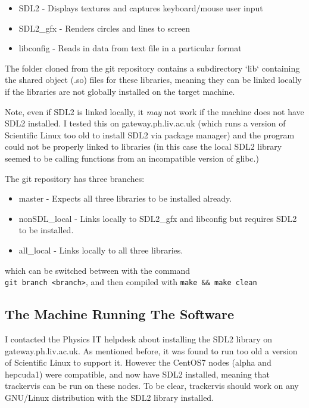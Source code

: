 \documentclass[12pt]{article}
\begin{document}
\begin{itemize}
	\item{SDL2 \quad - \quad Displays textures and captures keyboard/mouse user input}
	\item{SDL2\_gfx \quad - \quad Renders circles and lines to screen}
	\item{libconfig \quad - \quad Reads in data from text file in a particular format}
\end{itemize}

The folder cloned from the git repository contains a subdirectory `lib` containing the shared object (.so) files for these libraries, meaning they can be linked locally if the libraries are not globally installed on the target machine.\newline

Note, even if SDL2 is linked locally, it \emph{may} not work if the machine does not have SDL2 installed. I tested this on gateway.ph.liv.ac.uk (which runs a version of Scientific Linux too old to install SDL2 via package manager) and the program could not be properly linked to libraries (in this case the local SDL2 library seemed to be calling functions from an incompatible version of glibc.)\newline

The git repository has three branches:

\begin{itemize}
	\item{master \quad - \quad Expects all three libraries to be installed already.}
	\item{nonSDL\_local \quad - \quad Links locally to SDL2\_gfx and libconfig but requires SDL2 to be installed.}
	\item{all\_local \quad - \quad Links locally to all three libraries.}
\end{itemize}

which can be switched between with the command\\ \verb|git branch <branch>|, and then compiled with \verb|make && make clean|

\subsection*{The Machine Running The Software}

I contacted the Physics IT helpdesk about installing the SDL2 library on gateway.ph.liv.ac.uk. As mentioned before, it was found to run too old a version of Scientific Linux to support it. However the CentOS7 nodes (alpha and hepcuda1) were compatible, and now have SDL2 installed, meaning that trackervis can be run on these nodes. To be clear, trackervis should work on any GNU/Linux distribution with the SDL2 library installed.
\end{document}
